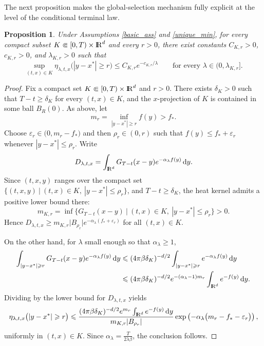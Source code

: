 \documentclass[11pt]{amsart}
\def\R{\mathrm{I\kern-0.21emR}}
\newcommand{\dd}{\,\mathrm{d}}
\renewcommand{\geq}{\geqslant}
\renewcommand{\leq}{\leqslant}
\renewcommand{\Vert}{|}
\numberwithin{equation}{section}
\numberwithin{figure}{section}
\newtheorem{proposition}[theorem]{Proposition}%
\theoremstyle{definition}\newtheorem{remark}[theorem]{Remark}%
\begin{document}
The next proposition makes the global-selection mechanism fully explicit at the level of the conditional terminal law.

\begin{proposition}\label{conditional_mass_concentration}
Under Assumptions \ref{basic_ass} and \ref{unique_min}, for every compact subset $K \Subset [0,T) \times \R^d$ and every $r > 0$, there exist constants $C_{K,r} > 0$, $c_{K,r} > 0$, and $\lambda_{K,r} > 0$ such that
$$
\sup_{(t,x) \in K} \eta_{\lambda,t,x}\big( \Vert y - x^* \Vert \geq r \big) \leq C_{K,r} e^{-c_{K,r}/\lambda}
\qquad
\text{for every } \lambda \in (0,\lambda_{K,r}].
$$
\end{proposition}

\begin{proof}
Fix a compact set $K \Subset [0,T) \times \R^d$ and $r > 0$. There exists $\delta_K > 0$ such that $T-t \geq \delta_K$ for every $(t,x) \in K$, and the $x$-projection of $K$ is contained in some ball $B_R(0)$.
As above, let
$$
m_r = \inf_{\Vert y - x^* \Vert \geq r} f(y) > f_*.
$$
Choose $\varepsilon_r \in \big( 0, m_r - f_* \big)$ and then $\rho_r \in (0,r)$ such that $f(y) \leq f_* + \varepsilon_r$ whenever $\Vert y - x^* \Vert \leq \rho_r$.
Write
$$
D_{\lambda,t,x} = \int_{\R^d} G_{T-t}(x-y)e^{-\alpha_\lambda f(y)}\dd y.
$$
Since $(t,x,y)$ ranges over the compact set $\big\{ (t,x,y) \ \big\vert\ (t,x) \in K,\ \Vert y - x^* \Vert \leq \rho_r \big\}$, and $T-t \geq \delta_K$, the heat kernel admits a positive lower bound there:
$$
m_{K,r} = \inf \big\{ G_{T-t}(x-y) \ \big\vert\ (t,x) \in K,\ \Vert y - x^* \Vert \leq \rho_r \big\} > 0.
$$
Hence $D_{\lambda,t,x} \geq m_{K,r}\vert B_{\rho_r} \vert e^{-\alpha_\lambda(f_* + \varepsilon_r)}$ for all $(t,x) \in K$.

On the other hand, for $\lambda$ small enough so that $\alpha_\lambda \geq 1$,
\begin{align*}
\int_{\Vert y - x^* \Vert \geq r} G_{T-t}(x-y)e^{-\alpha_\lambda f(y)}\dd y
&\leq
(4\pi\beta\delta_K)^{-d/2}\int_{\Vert y - x^* \Vert \geq r} e^{-\alpha_\lambda f(y)}\dd y \\
&\leq
(4\pi\beta\delta_K)^{-d/2}e^{-(\alpha_\lambda - 1)m_r}\int_{\R^d} e^{-f(y)}\dd y.
\end{align*}
Dividing by the lower bound for $D_{\lambda,t,x}$ yields
$$
\eta_{\lambda,t,x}\big( \Vert y - x^* \Vert \geq r \big)
\leq
\frac{(4\pi\beta\delta_K)^{-d/2}e^{m_r}\int_{\R^d} e^{-f(y)}\dd y}{m_{K,r}\vert B_{\rho_r} \vert}
\exp \left( - \alpha_\lambda \big( m_r - f_* - \varepsilon_r \big) \right),
$$
uniformly in $(t,x) \in K$. Since $\displaystyle \alpha_\lambda = \frac{T}{2\lambda\beta}$, the conclusion follows.
\end{proof}
\end{document}
